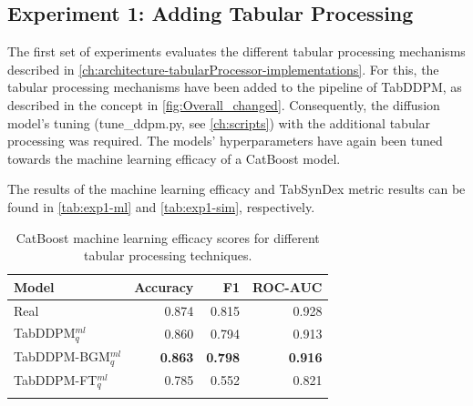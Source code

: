 \subsection{Experiment 1: Adding Tabular Processing}
\label{ch:Experiment-1}

The first set of experiments evaluates the different tabular processing mechanisms described in \autoref{ch:architecture-tabularProcessor-implementations}.
For this, the tabular processing mechanisms have been added to the pipeline of TabDDPM, as described in the concept in \autoref{fig:Overall_changed}.
Consequently, the diffusion model's tuning (tune\_ddpm.py, see \autoref{ch:scripts}) with the additional tabular processing was required.
The models' hyperparameters have again been tuned towards the machine learning efficacy of a CatBoost model.

The results of the machine learning efficacy and TabSynDex metric results can be found in \autoref{tab:exp1-ml} and \autoref{tab:exp1-sim}, respectively.
\begin{table}[h]
	\centering
	\begin{tabular}{lrrr}
		\toprule
		\textbf{Model}         & \textbf{Accuracy} & \textbf{F1}    & \textbf{ROC-AUC} \\
		\midrule
		Real                   & 0.874              & 0.815          & 0.928            \\
		TabDDPM$^{ml}_{q}$     & 0.860              & 0.794          & 0.913            \\
		TabDDPM-BGM$^{ml}_{q}$ & \textbf{0.863}     & \textbf{0.798} & \textbf{0.916}   \\
		TabDDPM-FT$^{ml}_{q}$  & 0.785              & 0.552          & 0.821            \\
		\bottomrule
		\multicolumn{4}{c}{}\\[-0.6em]
	\end{tabular}
	\caption[Experiment 1 ML-Efficacy]{CatBoost machine learning efficacy scores for different tabular processing techniques.}
	\label{tab:exp1-ml}
\end{table}

